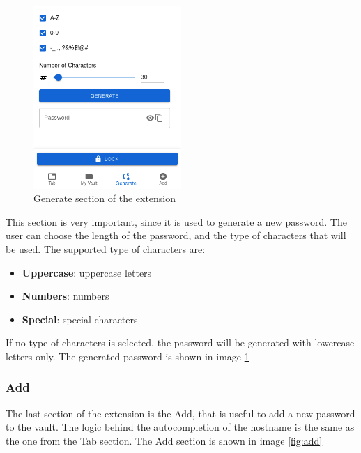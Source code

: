\begin{figure}[h!]
    \centering
    \vspace{0.5cm}
    \includegraphics[width=0.5\textwidth]{images/extension/generate.png}
    \caption{Generate section of the extension}
    \label{fig:generate} %
\end{figure}

This section is very important, since it is used to generate a new password. The user can choose the length of the password, and the type of characters that will be used. The supported type of characters are:

\begin{itemize}
    \item \textbf{Uppercase}: uppercase letters
    \item \textbf{Numbers}: numbers
    \item \textbf{Special}: special characters
\end{itemize}
If no type of characters is selected, the password will be generated with lowercase letters only.
The generated password is shown in image \ref{fig:generate}

\subsubsection{Add}

The last section of the extension is the Add, that is useful to add a new password to the vault. The logic behind the autocompletion of the hostname is the same as the one from the Tab section.
The Add section is shown in image \ref{fig:add}

